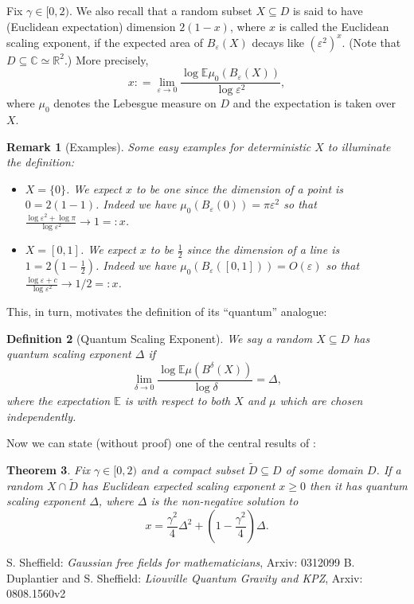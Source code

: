 \documentclass[11pt,reqno]{amsart}
\numberwithin{equation}{section}
\newtheorem{thm}{Theorem}[section]
\newtheorem{defi}[thm]{Definition}
\newtheorem{rem}[thm]{Remark}
\newcommand{\deq}{\mathrel{\mathop:}=}
\newcommand{\eps}{\varepsilon}
\begin{document}
Fix $\gamma\in[0,2)$. We also recall that a random subset $X\subseteq D$ is said to have (Euclidean expectation) dimension $2(1-x)$, where $x$ is called the Euclidean scaling exponent, if the expected area of $B_\eps(X)$ decays like $(\eps^2)^x$. (Note that $D\subseteq\mathbb C\simeq\mathbb R^2$.) More precisely, $$x\deq \lim_{\eps\rightarrow 0}\frac{\log \mathbb E\mu_0(B_\eps(X))}{\log\eps^2},$$ where $\mu_0$ denotes the Lebesgue measure on $D$ and the expectation is taken over $X$.
\begin{rem}[Examples]
	Some easy examples for deterministic $X$ to illuminate the definition:
	\begin{itemize}
		\item $X=\{0\}$. We expect $x$ to be one since the dimension of a point is $0 = 2(1-1)$. Indeed we have $\mu_0(B_\eps(0))=\pi\eps^2$ so that $\frac{\log\eps^2+\log\pi}{\log\eps^2}\rightarrow 1=:x$.
		\item $X=[0,1]$. We expect $x$ to be $\frac{1}{2}$ since the dimension of a line is $1=2(1-\frac{1}{2})$. Indeed we have $\mu_0(B_\eps([0,1]))=O(\eps)$ so that $\frac{\log\eps+c}{\log\eps^2}\rightarrow 1/2=:x$.
	\end{itemize}
\end{rem}

This, in turn, motivates the definition of its ``quantum'' analogue:
\begin{defi}[Quantum Scaling Exponent]
	We say a random $X\subseteq D$ has quantum scaling exponent $\Delta$ if $$\lim_{\delta\rightarrow 0}\frac{\log\mathbb E\mu(B^\delta(X))}{\log\delta}=\Delta,$$
	where the expectation $\mathbb E$ is with respect to both $X$ and $\mu$ which are chosen independently.
\end{defi}

Now we can state (without proof) one of the central results of \cite{Dup10}:

\begin{thm}
	Fix $\gamma\in[0,2)$ and a compact subset $\tilde D\subseteq D$ of some domain $D$. If a random $X\cap\tilde D$ has Euclidean expected scaling exponent $x\geq 0$ then it has quantum scaling exponent $\Delta$, where $\Delta$ is the non-negative solution to $$x=\frac{\gamma^2}{4}\Delta^2+\left(1-\frac{\gamma^2}{4}\right)\Delta.$$
\end{thm}


\begin{thebibliography}{00}
 S. Sheffield: \emph{Gaussian free fields for mathematicians}, Arxiv: 0312099
 B. Duplantier and S. Sheffield: \emph{Liouville Quantum Gravity and KPZ}, Arxiv: 0808.1560v2
\end{thebibliography}
\end{document}
